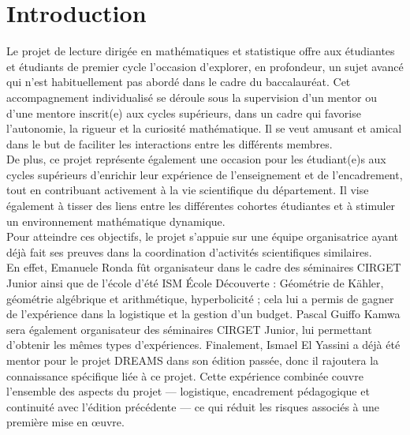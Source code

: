 \section{Introduction}

Le projet de lecture dirigée en mathématiques et statistique offre aux étudiantes et étudiants de premier cycle l'occasion d'explorer, en profondeur, un sujet avancé qui n'est habituellement pas abordé dans le cadre du baccalauréat. Cet accompagnement individualisé se déroule sous la supervision d'un mentor ou d'une mentore inscrit(e) aux cycles supérieurs, dans un cadre qui favorise l'autonomie, la rigueur et la curiosité mathématique. Il se veut amusant et amical dans le but de faciliter les interactions entre les différents membres.\\
De plus, ce projet représente également une occasion pour les étudiant(e)s aux cycles supérieurs d'enrichir leur expérience de l'enseignement et de l'encadrement, tout en contribuant activement à la vie scientifique du département. Il vise également à tisser des liens entre les différentes cohortes étudiantes et à stimuler un environnement mathématique dynamique. \\ 
Pour atteindre ces objectifs, le projet s'appuie sur une équipe organisatrice ayant déjà fait ses preuves dans la coordination d'activités scientifiques similaires. \\
En effet, Emanuele Ronda fût organisateur dans le cadre des séminaires CIRGET Junior ainsi que de l'école d'été ISM \'Ecole Découverte : Géométrie de K\"{a}hler, géométrie algébrique et arithmétique, hyperbolicité ; cela lui a permis de gagner de l'expérience dans la logistique et la gestion d'un budget. Pascal Guiffo Kamwa sera également organisateur des séminaires CIRGET Junior, lui permettant d'obtenir les mêmes types d'expériences. Finalement, Ismael El Yassini a déjà été mentor pour le projet DREAMS dans son édition passée, donc il rajoutera la connaissance spécifique liée à ce projet. Cette expérience combinée couvre l'ensemble des aspects du projet — logistique, encadrement pédagogique et continuité avec l'édition précédente — ce qui réduit les risques associés à une première mise en œuvre.
